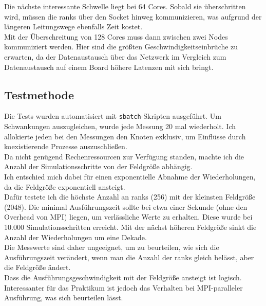 \documentclass[german,plainarticle,hyperref,utf8]{zihpub}
\begin{document}
	Die nächste interessante Schwelle liegt bei 64 Cores. Sobald sie überschritten wird, müssen die ranks über den Socket hinweg kommunizieren, was aufgrund der längeren Leitungswege ebenfalls Zeit kostet.\\
	
	Mit der Überschreitung von 128 Cores muss dann zwischen zwei Nodes kommuniziert werden. Hier sind die größten Geschwindigkeitseinbrüche zu erwarten, da der Datenaustausch über das Netzwerk im Vergleich zum Datenaustausch auf einem Board höhere Latenzen mit sich bringt.
	\subsection{Testmethode}
	Die Tests wurden automatisiert mit \texttt{sbatch}-Skripten ausgeführt. Um Schwankungen auszugleichen, wurde jede Messung 20 mal wiederholt. Ich allokierte jeden bei den Messungen den Knoten exklusiv, um Einflüsse durch koexistierende Prozesse auszuschließen.\\
	Da nicht genügend Rechenressourcen zur Verfügung standen, machte ich die Anzahl der Simulationsschritte von der Feldgröße abhängig.\\
	Ich entschied mich dabei für einen exponentielle Abnahme der Wiederholungen, da die Feldgröße exponentiell ansteigt.\\
	
	Dafür testete ich die höchste Anzahl an ranks (256) mit der kleinsten Feldgröße (2048). Die minimal Ausführungszeit sollte bei etwa einer Sekunde (ohne den Overhead von MPI) liegen, um verlässliche Werte zu erhalten. Diese wurde bei 10.000 Simulationsschritten erreicht. Mit der nächst höheren Feldgröße sinkt die Anzahl der Wiederholungen um eine Dekade.\\
	
	Die Messwerte sind daher ungeeignet, um zu beurteilen, wie sich die Ausführungszeit verändert, wenn man die Anzahl der ranks gleich belässt, aber die Feldgröße ändert.\\
	Dass die Ausführungsgeschwindigkeit mit der Feldgröße ansteigt ist logisch. Interessanter für das Praktikum ist jedoch das Verhalten bei MPI-paralleler Ausführung, was sich beurteilen lässt.\\
	
\end{document}
